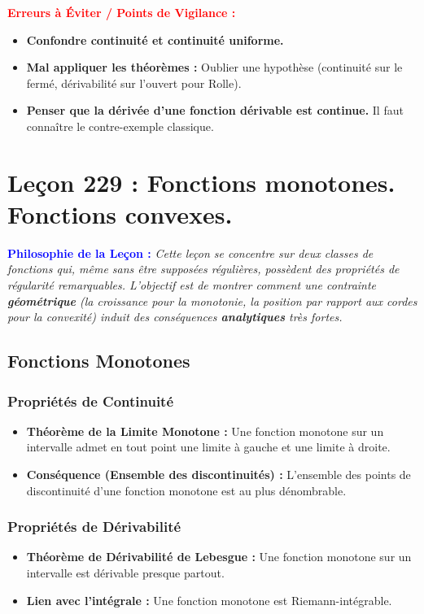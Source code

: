 \documentclass[12pt, a4paper, parskip=full]{report}
\theoremstyle{agregstyle}
\newenvironment{philosophie}
  {\par\medskip\noindent\begin{oframed}\noindent\textbf{\textcolor{blue}{Philosophie de la Leçon :}}\itshape}
  {\end{oframed}\par\medskip}
\newenvironment{erreurs}
  {\par\medskip\noindent\begin{oframed}\noindent\textbf{\textcolor{red}{Erreurs à Éviter / Points de Vigilance :}}}
  {\end{oframed}\par\medskip}
\begin{document}
\begin{erreurs}
    \begin{itemize}
        \item \textbf{Confondre continuité et continuité uniforme.}
        \item \textbf{Mal appliquer les théorèmes :} Oublier une hypothèse (continuité sur le fermé, dérivabilité sur l'ouvert pour Rolle).
        \item \textbf{Penser que la dérivée d'une fonction dérivable est continue.} Il faut connaître le contre-exemple classique.
    \end{itemize}
\end{erreurs}
\chapter{Leçon 229 : Fonctions monotones. Fonctions convexes.}

\begin{philosophie}
    Cette leçon se concentre sur deux classes de fonctions qui, même sans être supposées régulières, possèdent des propriétés de régularité remarquables. L'objectif est de montrer comment une contrainte \textbf{géométrique} (la croissance pour la monotonie, la position par rapport aux cordes pour la convexité) induit des conséquences \textbf{analytiques} très fortes.
\end{philosophie}

\section{Fonctions Monotones}
\subsection{Propriétés de Continuité}
\begin{itemize}
    \item \textbf{Théorème de la Limite Monotone :} Une fonction monotone sur un intervalle admet en tout point une limite à gauche et une limite à droite.
    \item \textbf{Conséquence (Ensemble des discontinuités) :} L'ensemble des points de discontinuité d'une fonction monotone est au plus dénombrable.
\end{itemize}
\subsection{Propriétés de Dérivabilité}
\begin{itemize}
    \item \textbf{Théorème de Dérivabilité de Lebesgue :} Une fonction monotone sur un intervalle est dérivable presque partout.
    \item \textbf{Lien avec l'intégrale :} Une fonction monotone est Riemann-intégrable.
\end{itemize}
\end{document}
